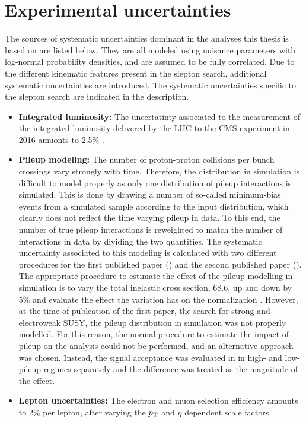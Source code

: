 \section{Experimental uncertainties}
\noindent
\justify
The sources of systematic uncertainties dominant in the analyses this thesis is based on are listed below. They are all modeled using nuisance parameters with log-normal probability densities, and are assumed to be fully correlated. 
Due to the different kinematic features present in the slepton search, additional systematic uncertainties are introduced. 
The systematic uncertainties specific to the slepton search are indicated in the description. 
\begin{itemize}
\item{\bf{Integrated luminosity:}} The uncertatinty associated to the measurement of the integrated luminosity delivered by the LHC to the CMS experiment in 2016 amuonts to 2.5\% \cite{CMS-PAS-LUM-17-001}.
\item{\bf{Pileup modeling:}} The number of proton-proton collisions per bunch crossings vary strongly with time. 
Therefore, the distribution in simulation is difficult to model properly as only one distribution of pileup interactions is simulated. 
This is done by drawing a number of so-called minimum-bias events from a simulated sample according to the input distribution, which clearly does not reflect the time varying pileup in data. 
To this end, the number of true pileup interactions is reweighted to match the number of interactions in data by dividing the two quantities.
The systematic uncertainty associated to this modeling is calculated with two different procedures for the first published paper (\cite{Sirunyan:2017qaj}) and the second published paper (\cite{Sirunyan:2018nwe}). 
The appropriate procedure to estimate the effect of the pileup modelling in simulation is to vary the total inelastic cross section, 68.6\mb, up and down by 5\% and evaluate the effect the variation has on the normalization \cite{Sirunyan:2018nqx}. 
However, at the time of publcation of the first paper, the search for strong and electroweak SUSY, the pileup distribution in simulation was not properly modelled. 
For this reason, the normal procedure to estimate the impact of pileup on the analysis could not be performed, and an alternative approach was chosen. 
Instead, the signal acceptance was evaluated in in high- and low-pileup regimes separately and the difference was treated as the magnitude of the effect.
\item{\bf{Lepton uncertainties:}} The electron and muon selection efficiency amounts to 2\% per lepton, after varying the $p_{\mathrm{T}}$ and $\eta$ dependent scale factors. 

\end{itemize}
